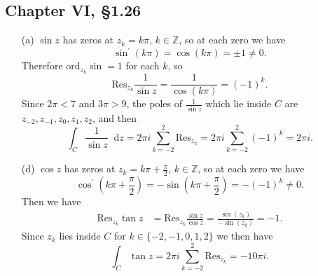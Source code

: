 \documentclass{article}
\newcommand\dif{\mathop{}\!\mathrm{d}}
\newcommand\Res{\mathrm{Res}}
\newcommand\ord{\mathrm{ord}}
\begin{document}
\subsection*{Chapter VI, \S1.26}
\begin{enumerate}
  \item[(a)]{
    $\sin z$ has zeros at $z_k = k \pi$, $k \in \mathbb{Z}$, so at
    each zero we have 
    $$
      \sin^\prime(k\pi) 
    = \cos(k \pi) 
    = \pm 1 \neq 0.
    $$
    Therefore $\ord_{z_k} \sin = 1$ for each $k$, so
    $$
      \Res_{z_k} \frac{1}{\sin z} 
    = \frac{1}{\cos(k\pi)}
    = (-1)^k.
    $$
    Since $2 \pi < 7$ and $3 \pi > 9$, the poles of $\frac{1}{\sin z}$
    which lie inside $C$ are $z_{-2}, z_{-1}, z_{0}, z_{1}, z_{2}$, and then
    $$
      \int_C \frac{1}{\sin z} \dif z
    = 2 \pi i \sum_{k=-2}^2 \Res_{z_k} 
    = 2 \pi i \sum_{k=-2}^2 (-1)^k
    = 2 \pi i.
    $$
  }
  \item[(d)]{
    $\cos z$ has zeros at $z_k = k \pi + \frac{\pi}{2}$,
    $k \in \mathbb{Z}$, so at each zero we have
    $$
      \cos^\prime\left(k\pi + \frac{\pi}{2}\right)
    = -\sin\left(k \pi + \frac{\pi}{2}\right)
    = -(-1)^k \neq 0.
    $$
    Then we have
    \begin{align*}
       \Res_{z_k} \tan z
    &= \Res_{z_k} \frac{\sin z}{\cos z}
     = \frac{\sin(z_k)}{-\sin(z_k)}
     = -1.
    \end{align*}
    Since $z_k$ lies inside $C$ for 
    $k \in \{ -2, -1, 0, 1, 2 \}$ we then have
    $$
      \int_C \tan z 
    = 2 \pi i \sum_{k=-2}^{2} \Res_{z_k}
    = -10 \pi i.
    $$
  }
\end{enumerate}
\end{document}
